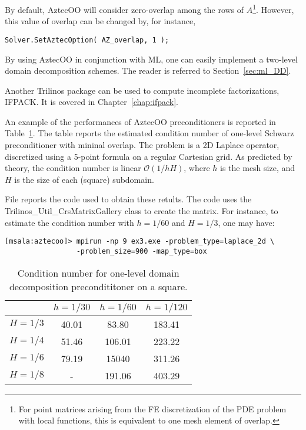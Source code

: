 By default, AztecOO will consider zero-overlap among the rows of
$A$\footnote{For point matrices arising from the FE discretization of
  the PDE problem with local functions, this is equivalent to one mesh
  element of overlap.}. However, this value of overlap can be changed by,
for instance,
\begin{verbatim}
Solver.SetAztecOption( AZ_overlap, 1 );
\end{verbatim}

\begin{remark} By using AztecOO in conjunction with ML, one can easily
  implement a two-level domain decomposition schemes. The reader is
  referred to Section~\ref{sec:ml_DD}.
\end{remark}

\begin{remark} Another Trilinos package can be used to compute
  incomplete factorizations, IFPACK. It is covered in
  Chapter~\ref{chap:ifpack}.
\end{remark}

An example of the performances of AztecOO preconditioners is reported in
Table~\ref{tab:aztecoo:dd}. The table reports the estimated condition
number of one-level Schwarz preconditioner with mininal overlap. The
problem is a 2D Laplace operator, discretized using a 5-point formula on
a regular Cartesian grid. As predicted by theory, the condition number
is linear $\mathcal{O}(1/hH)$, where $h$ is the mesh size, and $H$ is
the size of each (square) subdomain.

File  reports the code used to obtain these
retults. The code uses the Trilinos\_Util\_CrsMatrixGallery class to
create the matrix. For instance, to estimate the condition number with
$h=1/60$ and $H=1/3$, one may have:
\begin{verbatim}
[msala:aztecoo]> mpirun -np 9 ex3.exe -problem_type=laplace_2d \
                 -problem_size=900 -map_type=box
\end{verbatim}

\begin{table}[htbp]
  \centering
  \begin{tabular}{| c | c c c |}
    \hline
    & $h=1/30$ & $h=1/60$ & $h=1/120$ \\
    \hline
    $H=1/3$ & 40.01 & 83.80 & 183.41 \\
    $H=1/4$ & 51.46 & 106.01 & 223.22 \\
    $H=1/6$ & 79.19 & 15040 & 311.26 \\
    $H=1/8$ & -     & 191.06 & 403.29 \\
    \hline
  \end{tabular}
  \caption{Condition number for one-level domain decomposition precondititoner on a square.}
  \label{tab:aztecoo:dd}
\end{table}

